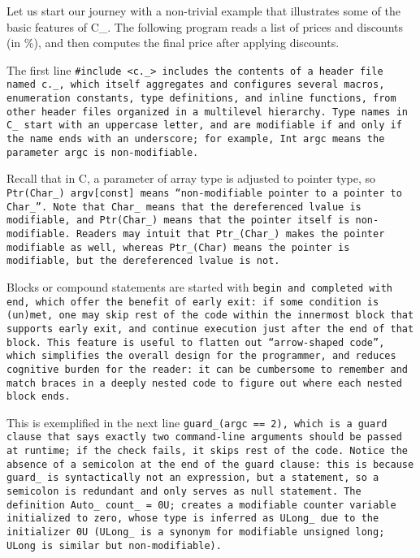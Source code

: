 Let us start our journey with a non-trivial example
that illustrates some of the basic features of C\_.
The following program reads a list of prices and discounts (in \%),
and then computes the final price after applying discounts.


The first line \tt{#include <c._>} includes the contents of a header file
named \tt{c._}, which itself aggregates and configures several macros,
enumeration constants, type definitions, and inline functions,
from other header files organized in a multilevel hierarchy.
Type names in C\_ start with an uppercase letter,
and are modifiable if and only if the name ends with an underscore;
for example, \tt{Int argc} means the parameter \tt{argc} is non-modifiable.

Recall that in C, a parameter of array type is adjusted to pointer type,
so \tt{Ptr(Char_) argv[const]} means
``non-modifiable pointer to a pointer to \tt{Char_}''.
Note that \tt{Char_} means that the dereferenced lvalue is modifiable,
and \tt{Ptr(Char_)} means that the pointer itself is non-modifiable.
Readers may intuit that \tt{Ptr_(Char_)} makes the pointer modifiable as well,
whereas \tt{Ptr_(Char)} means the pointer is modifiable,
but the dereferenced lvalue is not.

Blocks or compound statements are started with \tt{begin}
and completed with \tt{end}, which offer the benefit of early exit:
if some condition is (un)met, one may skip rest of the
code within the innermost block that supports early exit,
and continue execution just after the end of that block.
This feature is useful to flatten out ``arrow-shaped code'',
which simplifies the overall design for the programmer,
and reduces cognitive burden for the reader:
it can be cumbersome to remember and match braces in a
deeply nested code to figure out where each nested block ends.

This is exemplified in the next line \tt{guard_(argc == 2)},
which is a guard clause that says exactly two command-line arguments should
be passed at runtime; if the check fails, it skips rest of the code.
Notice the absence of a semicolon at the end of the guard clause:
this is because \tt{guard_} is syntactically not an expression, but a
statement, so a semicolon is redundant and only serves as null statement.
The definition \tt{Auto_ count_ = 0U;} creates a
modifiable counter variable initialized to zero,
whose type is inferred as \tt{ULong_} due to the initializer \tt{0U}
(\tt{ULong_} is a synonym for modifiable \tt{unsigned long};
\tt{ULong} is similar but non-modifiable).

